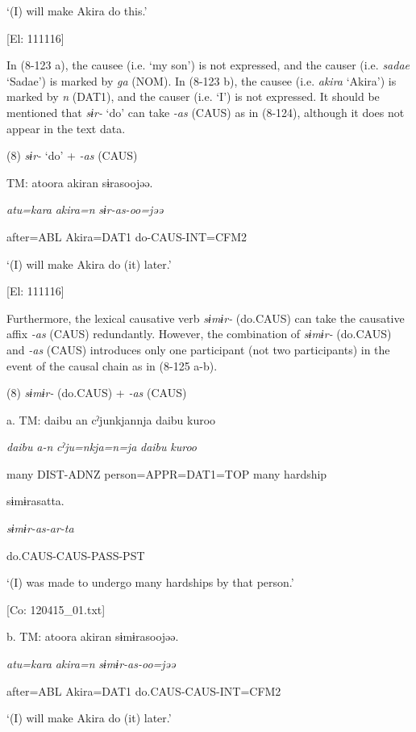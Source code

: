       ‘(I) will make Akira do this.’

      [El: 111116]

In (8-123 a), the causee (i.e. ‘my son’) is not expressed, and the causer (i.e. \textit{sadae} ‘Sadae’) is marked by \textit{ga} (NOM). In (8-123 b), the causee (i.e. \textit{akira} ‘Akira’) is marked by \textit{n} (DAT1), and the causer (i.e. ‘I’) is not expressed. It should be mentioned that \textit{sɨr-} ‘do’ can take \textit{-as} (CAUS) as in (8-124), although it does not appear in the text data.

(8)  \textit{sɨr-} ‘do’ + \textit{{}-as} (CAUS)

  TM:  atoora  akiran  sɨrasoojəə.

    \textit{atu=kara}  \textit{akira=n}  \textit{sɨr-as{}-oo=jəə}

    after=ABL  Akira=DAT1  do-CAUS-INT=CFM2

    ‘(I) will make Akira do (it) later.’

    [El: 111116]

Furthermore, the lexical causative verb \textit{sɨmɨr-} (do.CAUS) can take the causative affix \textit{{}-as} (CAUS) redundantly. However, the combination of \textit{sɨmɨr-} (do.CAUS) and \textit{{}-as} (CAUS) introduces only one participant (not two participants) in the event of the causal chain as in (8-125 a-b).

(8)  \textit{sɨmɨr-} (do.CAUS) + \textit{{}-as} (CAUS)

  a.  TM:  {\textbar}daibu{\textbar}  an  cˀjunkjannja  {\textbar}daibu  kuroo{\textbar}

      \textit{daibu}  \textit{a-n}  \textit{cˀju=nkja=n=ja}  \textit{daibu}  \textit{kuroo}

      many  DIST-ADNZ  person=APPR=DAT1=TOP  many  hardship

      sɨmɨrasatta.

      \textit{sɨmɨr-as-ar-ta}

      do.CAUS-CAUS-PASS-PST

      ‘(I) was made to undergo many hardships by that person.’

      [Co: 120415\_01.txt]

  b.  TM:  atoora  akiran  sɨmɨrasoojəə.

      \textit{atu=kara}  \textit{akira=n}  \textit{sɨmɨr-as-oo=jəə}

      after=ABL  Akira=DAT1  do.CAUS-CAUS-INT=CFM2

      ‘(I) will make Akira do (it) later.’

